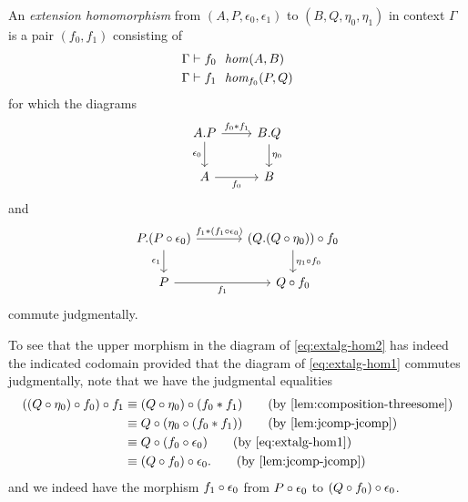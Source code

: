 \begin{defn}
An \emph{extension homomorphism} from $(A,P,\epsilon_0,\epsilon_1)$ to
$(B,Q,\eta_0,\eta_1)$ in context $\Gamma$ is a pair $(f_0,f_1)$ consisting of
\begin{align*}
\jhom*{\Gamma}{A}{B}{f_0}
  \\
\jfhom*{\Gamma}{A}{B}{f_0}{P}{Q}{f_1}
\end{align*}
for which the diagrams
\begin{equation}\label{eq:extalg-hom1}
\begin{tikzcd}
\ctxext{A}{P}
  \ar{r}{\jvcomp{}{f_0}{f_1}}
  \ar{d}[swap]{\epsilon_0}
& \ctxext{B}{Q}
  \ar{d}{\eta_0}
  \\
A
  \ar{r}[swap]{f_0}
& B
\end{tikzcd}
\end{equation}
and
\begin{equation}\label{eq:extalg-hom2}
\begin{tikzcd}[column sep=large]
\ctxext{P}{\jcomp{}{\epsilon_0}{P}}
  \ar{r}{\jvcomp{}{f_1}{\jcomp{}{\epsilon_0}{f_1}}}
  \ar{d}[swap]{\epsilon_1}
& \jcomp{}{f_0}{\ctxext{Q}{\jcomp{}{\eta_0}{Q}}}
  \ar{d}{\jcomp{}{f_0}{\eta_1}}
  \\
P
  \ar{r}[swap]{f_1}
& \jcomp{}{f_0}{Q}
\end{tikzcd}
\end{equation}
commute judgmentally.
\end{defn}

\begin{rmk}
To see that the upper morphism in the diagram of \autoref{eq:extalg-hom2} has
indeed the indicated codomain provided that the diagram of \autoref{eq:extalg-hom1}
commutes judgmentally, note that we have the judgmental equalities
\begin{align*}
\jcomp{}{f_1}{\jcomp{}{f_0}{\jcomp{}{\eta_0}{Q}}}
& \jdeq 
  \jcomp{}{\jvcomp{}{f_0}{f_1}}{\jcomp{}{\eta_0}{Q}}
  \tag{by \autoref{lem:composition-threesome}}
  \\
& \jdeq
  \jcomp{}{\jcomp{}{\jvcomp{}{f_0}{f_1}}{\eta_0}}{Q}
  \tag{by \autoref{lem:jcomp-jcomp}}
  \\
& \jdeq
  \jcomp{}{\jcomp{}{\epsilon_0}{f_0}}{Q}
  \tag{by \autoref{eq:extalg-hom1}}
  \\
& \jdeq
  \jcomp{}{\epsilon_0}{\jcomp{}{f_0}{Q}}.
  \tag{by \autoref{lem:jcomp-jcomp}}
\end{align*}
and we indeed have the morphism $\jcomp{}{\epsilon_0}{f_1}$ from 
$\jcomp{}{\epsilon_0}{P}$ to $\jcomp{}{\epsilon_0}{\jcomp{}{f_0}{Q}}$.
\end{rmk}

